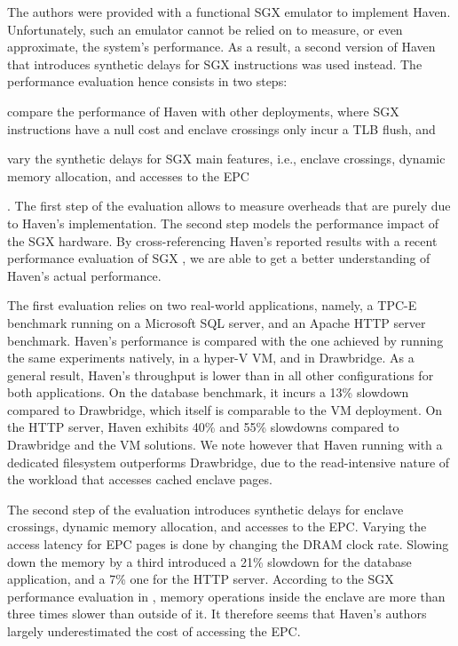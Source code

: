 The authors were provided with a functional SGX emulator to implement Haven.
Unfortunately, such an emulator cannot be relied on to measure, or even approximate, the system's performance.
As a result, a second version of Haven that introduces synthetic delays for SGX instructions was used instead.
The performance evaluation hence consists in two steps:
\begin{enumerate*}
	\item compare the performance of Haven with other deployments, where SGX instructions have a null cost and enclave crossings only incur a TLB flush, and
	\item vary the synthetic delays for SGX main features, i.e., enclave crossings, dynamic memory allocation, and accesses to the EPC
\end{enumerate*}.
The first step of the evaluation allows to measure overheads that are purely due to Haven's implementation.
The second step models the performance impact of the SGX hardware.
By cross-referencing Haven's reported results with a recent performance evaluation of SGX \cite{DBLP:conf/IEEEwisa/ZhaoSTZX16}, we are able to get a better understanding of Haven's actual performance.

The first evaluation relies on two real-world applications, namely, a TPC-E benchmark running on a Microsoft SQL server, and an Apache HTTP server benchmark.
Haven's performance is compared with the one achieved by running the same experiments natively, in a hyper-V VM, and in Drawbridge.
As a general result, Haven's throughput is lower than in all other configurations for both applications.
On the database benchmark, it incurs a 13\% slowdown compared to Drawbridge, which itself is comparable to the VM deployment.
On the HTTP server, Haven exhibits 40\% and 55\% slowdowns compared to Drawbridge and the VM solutions.
We note however that Haven running with a dedicated filesystem outperforms Drawbridge, due to the read-intensive nature of the workload that accesses cached enclave pages.

The second step of the evaluation introduces synthetic delays for enclave crossings, dynamic memory allocation, and accesses to the EPC.
Varying the access latency for EPC pages is done by changing the DRAM clock rate.
Slowing down the memory by a third introduced a 21\% slowdown for the database application, and a 7\% one for the HTTP server.
According to the SGX performance evaluation in \cite{DBLP:conf/IEEEwisa/ZhaoSTZX16}, memory operations inside the enclave are more than three times slower than outside of it.
It therefore seems that Haven's authors largely underestimated the cost of accessing the EPC.

